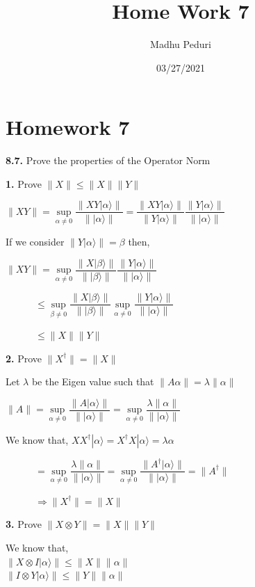 \documentclass [12pt]{article}
\title{Home Work 7}
\author{Madhu Peduri}
\date{03/27/2021}
\theoremstyle{definition}
\newcommand{\ket}[1]{| {#1} \rangle}
\begin{document}
\section*{Homework 7}

{\bf 8.7.} Prove the properties of the Operator Norm

\phantom{1em} {\bf 1.} Prove $\|X \| \leq \| X \| \| Y \|$

\phantom{1000em} $\| X Y \| = \sup\limits_{\alpha \neq 0} \dfrac{\| XY \ket{\alpha}\|}{\| \ket{\alpha}\|} =  \dfrac{\| XY \ket{\alpha}\|}{\| Y \ket{\alpha}\|} \dfrac{\| Y \ket{\alpha}\|}{\| \ket{\alpha}\|}$

\phantom{1000em} If we consider $\| Y \ket{\alpha}\| = \beta$ then,

\phantom{1000em} $\| X Y \| = \sup\limits_{\alpha \neq 0} \dfrac{\| X \ket{\beta}\|}{\| \ket{\beta}\|} \dfrac{\| Y \ket{\alpha}\|}{\| \ket{\alpha}\|}$

\phantom{1000em}  $\quad\quad\quad \leq \sup\limits_{\beta \neq 0} \dfrac{\| X \ket{\beta}\|}{\| \ket{\beta}\|} \sup\limits_{\alpha \neq 0} \dfrac{\| Y \ket{\alpha}\|}{\| \ket{\alpha}\|}$

\phantom{1000em}  $\quad\quad\quad \leq \| X \| \| Y \|$

\phantom{1em} {\bf 2.} Prove $\|X^{\dag} \| = \| X\|$

\phantom{1000em} Let $\lambda $ be the Eigen value such that $\| A\alpha \| = \lambda\|\alpha\|$

\phantom{1000em} $\|A\| = \sup\limits_{\alpha \neq 0} \dfrac{\| A \ket{\alpha}\|}{\| \ket{\alpha}\|} = \sup\limits_{\alpha \neq 0} \dfrac{\lambda\|\alpha\|}{\| \ket{\alpha}\|}$

\phantom{1000em} We know that, $XX^{\dag}\ket{\alpha} = X^{\dag}X\ket{\alpha} = \lambda\alpha$

\phantom{1000em} $\quad\quad\quad = \sup\limits_{\alpha \neq 0} \dfrac{\lambda\|\alpha\|}{\| \ket{\alpha}\|} = \sup\limits_{\alpha \neq 0} \dfrac{\| A^{\dag} \ket{\alpha}\|}{\| \ket{\alpha}\|} = \|A^{\dag}\|$

 \phantom{1000em} $\quad\quad\quad\Rightarrow \|X^{\dag} \| = \| X\|$
 
 \phantom{1em} {\bf 3.} Prove $\|X \otimes Y\| = \| X \| \| Y \|$
 
 \phantom{1000em} We know that,\\ 
 \phantom{1000em} $\|X \otimes I \ket{\alpha} \| \leq \|X \| \| \alpha\|$ \\
 \phantom{1000em} $\|I \otimes Y \ket{\alpha} \| \leq \|Y \| \| \alpha\|$
 
\end{document}
